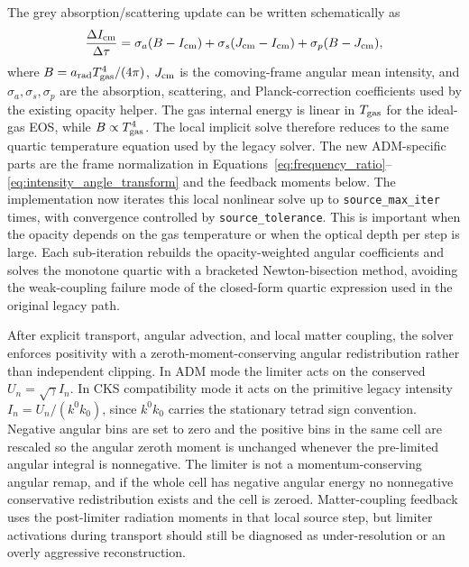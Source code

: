 \documentclass[11pt]{article}
\newcommand{\code}[1]{\texttt{#1}}
\begin{document}
The grey absorption/scattering update can be written schematically as
\begin{equation}
  \frac{\Delta I_{\rm cm}}{\Delta \tau}
  =
  \sigma_a(B-I_{\rm cm})
  +\sigma_s(J_{\rm cm}-I_{\rm cm})
  +\sigma_p(B-J_{\rm cm}),
  \label{eq:grey_coupling_schematic}
\end{equation}
where \(B=a_{\rm rad}T_{\rm gas}^4/(4\pi)\), \(J_{\rm cm}\) is the
comoving-frame angular mean intensity, and \(\sigma_a,\sigma_s,\sigma_p\) are
the absorption, scattering, and Planck-correction coefficients used by the
existing opacity helper.  The gas internal energy is linear in \(T_{\rm gas}\)
for the ideal-gas EOS, while \(B\propto T_{\rm gas}^4\).  The local implicit
solve therefore reduces to the same quartic temperature equation used by the
legacy solver.  The new ADM-specific parts are the frame normalization in
Equations~\eqref{eq:frequency_ratio}--\eqref{eq:intensity_angle_transform} and
the feedback moments below.
The implementation now iterates this local nonlinear solve up to
\code{source\_max\_iter} times, with convergence controlled by
\code{source\_tolerance}.  This is important when the opacity depends on the
gas temperature or when the optical depth per step is large.  Each sub-iteration
rebuilds the opacity-weighted angular coefficients and solves the monotone
quartic with a bracketed Newton-bisection method, avoiding the weak-coupling
failure mode of the closed-form quartic expression used in the original legacy
path.

After explicit transport, angular advection, and local matter coupling, the
solver enforces positivity with a zeroth-moment-conserving angular
redistribution rather than independent clipping.  In ADM mode the limiter acts on the conserved
\(U_n=\sqrt{\gamma}I_n\).  In CKS compatibility mode it acts on the primitive
legacy intensity \(I_n=U_n/(k^0k_0)\), since \(k^0k_0\) carries the stationary
tetrad sign convention.  Negative angular bins are set to zero and the positive
bins in the same cell are rescaled so the angular zeroth moment is unchanged
whenever the pre-limited angular integral is nonnegative.  The limiter is not a
momentum-conserving angular remap, and if the whole cell has negative angular
energy no nonnegative conservative redistribution exists and the cell is
zeroed.  Matter-coupling feedback uses the post-limiter radiation moments in
that local source step, but limiter activations during transport should still be
diagnosed as under-resolution or an overly aggressive reconstruction.
\end{document}
